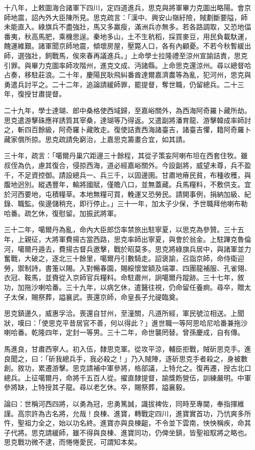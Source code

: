 \begin{pinyinscope}
十八年，上敕圖海合諸軍下四川，定四道進兵，思克與將軍畢力克圖出略陽。會京師地震，詔內外大臣陳所見。思克疏言：「漢中、興安山嶺紆險，賊劃斷要隘，師未能直入。綠旗兵不盡強壯，馬又多羸瘦，滿洲兵亦無多。若各路調取，又恐地偪番夷，秋高馬肥，乘機思逞。秦地多山，土不生秔稻，採買麥豆，用民負載馱運，餽運維艱。諸軍聞京師地震，傾壞房屋，壓斃人口，各有內顧憂。不若今秋暫緩出師，選強壯，飼戰馬，俟來春再議進兵。」上命學士拉隆禮至涼州宣諭詰責，思克引罪。與畢力克圖率師攻階州，進克文成、沔諸縣。上命思克還涼州。尋以總督哈占奏，移駐莊浪。二十年，慶陽民耿飛糾番酋達爾嘉濟農等為亂，犯河州，思克與勇遣兵討平之。二十二年，追論請緩師罪，罷提督，奪世職，仍留總兵。二十三年，復授甘肅提督。

二十九年，學士達瑚、郎中桑格使西域歸，至嘉峪關外，為西海阿奇羅卜藏所劫。思克遣游擊硃應祥誘質其宰桑，達瑚等乃得返。又遣副將潘育龍、游擊韓成率師討之，斬四百餘級，阿奇羅卜藏敗走。復使詰責西海諸臺吉，諸臺吉懼，籍阿奇羅卜藏家償所掠。思克疏請免窮治，上嘉思克籌畫合宜，如其請。

三十年，疏言：「噶爾丹巢穴距邊三十餘程，其從子策妄阿喇布坦在西套住牧。雖叔侄為仇，慮其復合，侵掠西海，道必經嘉峪關外。今設副將，威望未尊，兵不盈千，不足資控御。請設總兵一、兵三千，以固邊圉。甘肅地瘠民貧，布種收穫，與腹地迥別。縱遇豐年，輸將國賦，僅贍八口，並無蓋藏。兵馬糧料，不敷供支。宜於河西要地，屯積糧草。本地無糧可買，輓運又恐勞民。請開事例，捐納加級、紀錄、職監。俟邊儲稍充，即行停止。」三十一年，加太子少保，予世職拜他喇布勒哈番。疏乞休，復慰留。加振武將軍。

三十二年，噶爾丹為亂，命內大臣郎岱率禁旅出駐寧夏，以思克為參贊。三十五年，上親征，大將軍費揚古當西路，思克率師出寧夏，與會於翁金。上駐蹕克魯倫河，噶爾丹遁去，費揚古督兵邀擊，戰於昭莫多。思克將綠旗兵居中，與諸軍並力奮戰，大破之，逐北三十餘里，噶爾丹引數騎走。詔褒諭，召詣京師，命侍衛迎勞，禦制詩，書箑以賜。入對暢春園，賜綏懷堂額及端罩、四團龍補服、孔雀翎、衣冠、鞍馬，並賚從入京師官兵糧料。命駐肅州，詗噶爾丹蹤跡。三十七年，敘功，加拖沙喇哈番。三十九年，以病乞休，遣醫往視，仍命留任養痾。尋卒，贈太子太保，賜祭葬，謚襄武。喪還京師，命皇長子允禔臨奠。

思克鎮邊久，威惠孚洽。喪還自甘州，至潼關，凡道所經，軍民號泣相送。上聞狀，嘆曰：「使思克平昔居官不善，何以得此？」進世職一等阿思哈尼哈番兼拖沙喇哈番。乾隆四年，定封一等男。三十二年，命世襲罔替。曾孫慶成，自有傳。

馬進良，甘肅西寧人。初入伍，隸思克軍。從攻平涼，輔臣拒戰，賊斫思克手。進良聞之，曰：「斫我總兵手，我必殺之！」乃入賊陣，逐斫思克手者殺之，身被數創。敘功，累遷游擊。思克請補中軍參將，格部議，上特允之。復再遷，授古北口總兵。上征噶爾丹，命將千五百人從。擢直隸提督，諭獎飭營伍，訓練嚴明。中軍參將缺，上特授其子龍。尋以老乞休。卒，賜祭葬，謚襄毅。

論曰：世稱河西四將，以勇為冠，忠勇篤誠，識拔裨佐，同時至專閫，奉指揮維謹。高宗許為古名將，允哉！良棟、進寶，轉戰定四川，進寶實首功，乃忼爽多所忤，聖祖力全之，始以功名終。進寶亦與良棟齟，不令並下雲南，怏怏稱疾，命其子代將。思克請緩師，雖不得與良棟、進寶同功，仍俾坐鎮，皆聖祖馭將之略也。思克戰功微不逮，而惓惓愛民，可謂知本矣。


\end{pinyinscope}